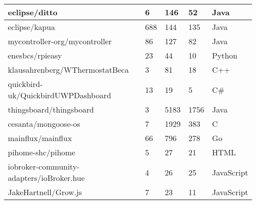 \begin{table}
\begin{tabular}{|l|l|l|l|l|}
        eclipse/ditto & 6 & 146 & 52 & Java \\ \hline
        eclipse/kapua & 688 & 144 & 135 & Java \\ \hline
        mycontroller-org/mycontroller & 86 & 127 & 82 & Java \\ \hline
        enesbcs/rpieasy & 23 & 44 & 10 & Python \\ \hline
        klausahrenberg/WThermostatBeca & 3 & 81 & 18 & C++ \\ \hline
        quickbird-uk/QuickbirdUWPDashboard & 13 & 19 & 5 & C\# \\ \hline
        thingsboard/thingsboard & 3 & 5183 & 1756 & Java \\ \hline
        cesanta/mongoose-os & 7 & 1929 & 383 & C \\ \hline
        mainflux/mainflux & 66 & 796 & 278 & Go \\ \hline
        pihome-shc/pihome & 5 & 27 & 21 & HTML \\ \hline
        iobroker-community-adapters/ioBroker.hue & 4 & 26 & 25 & JavaScript \\ \hline
        JakeHartnell/Grow.js & 7 & 23 & 11 & JavaScript \\ \hline
    \end{tabular}
\end{table}

